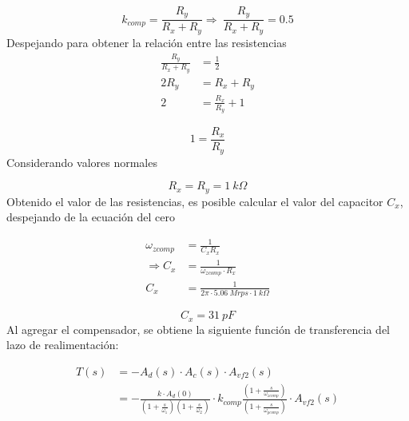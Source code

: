 \documentclass[a4paper,12pt]{article}
\begin{document}
\begin{equation}
    k_{comp} = \frac{R_y}{R_x + R_y}  \Longrightarrow  ~ \frac{R_y}{R_x + R_y} = 0.5
\end{equation}
\vspace{0.2cm}
\hspace{1mm}Despejando para obtener la relación entre las resistencias
\begin{align}
    \frac{R_y}{R_x + R_y} &= \frac{1}{2}        \\
                     2R_y &= R_x + R_y           \\
                        2 &= \frac{R_x}{R_y} + 1
\end{align}

\begin{equation}
    \boxed{
    1 = \frac{R_x}{R_y}
    }
\end{equation}
\vspace{0.2cm}
\hspace{1mm}Considerando valores normales 

\begin{equation}
    \boxed{
    R_x = R_y = 1~k\Omega
    }
\end{equation}
\vspace{0.2cm}
\hspace{1mm}Obtenido el valor de las resistencias, es posible calcular el valor del capacitor $C_x$, despejando de la ecuación del cero 

\begin{equation}
    \begin{aligned}
              \omega_{zcomp} &= \frac{1}{C_x R_x}                     \\
        \Longrightarrow C_x &= \frac{1}{\omega_{zcomp} \cdot {R_x}}  \\
                        C_x &= \frac{1}{2\pi \cdot 5.06~Mrps \cdot 1~k\Omega}
    \end{aligned}
\end{equation}

\begin{equation}
    \boxed{
    C_x = 31~pF
    }
\end{equation}
\vspace{0.2cm}
\hspace{1mm}Al agregar el compensador, se obtiene la siguiente función de transferencia del lazo de realimentación:

\begin{equation}
    \begin{aligned}
        T(s) &= -A_d(s) \cdot A_c(s) \cdot A_{vf2} (s)\\
             &= - \frac{k\cdot A_d(0)}{\left(1+\frac{s}{\omega_1}\right)\left(1+\frac{s}{\omega_2}\right)} \cdot k_{comp} \frac{\left(1 + \frac{s}{\omega_{zcomp}}\right)}{\left(1+\frac{s}{\omega_{pcomp}}\right)} \cdot A_{vf2}(s)
    \end{aligned}
\end{equation}
\end{document}
